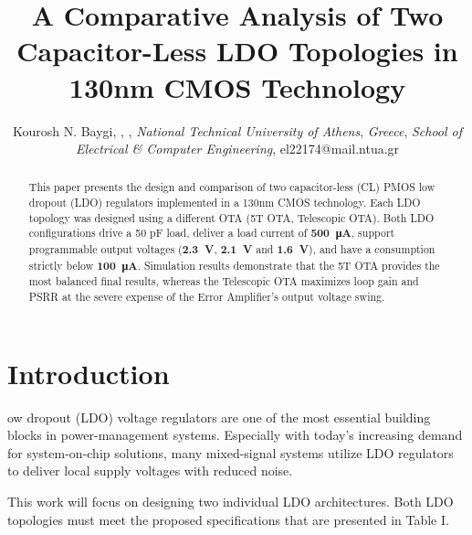 \documentclass[journal]{IEEEtran}
\begin{document}

\title{A Comparative Analysis of Two Capacitor-Less LDO Topologies in 130nm CMOS Technology}
\author{Kourosh N. Baygi, , , \textit{National Technical University of Athens}, \textit{Greece}, \textit{School of Electrical \& Computer Engineering}, el22174@mail.ntua.gr \vspace{-14pt}}
\maketitle

\begin{abstract}
This paper presents the design and comparison of two capacitor-less (CL) PMOS low dropout (LDO) regulators implemented in a 130nm CMOS technology. Each LDO topology was designed using a different OTA (5T OTA, Telescopic OTA). Both LDO configurations drive a 50 pF load, deliver a load current of {\bfseries \SI[per-mode=symbol,detect-weight]{500}{\micro\ampere}}, support programmable output voltages ({\bfseries \SI[per-mode=symbol,detect-weight]{2.3}{\volt}}, {\bfseries \SI[per-mode=symbol,detect-weight]{2.1}{\volt}} and {\bfseries \SI[per-mode=symbol,detect-weight]{1.6}{\volt}}), and have a consumption strictly below {\bfseries \SI[per-mode=symbol,detect-weight]{100}{\micro\ampere}}. Simulation results demonstrate that the 5T OTA provides the most balanced final results, whereas the Telescopic OTA maximizes loop gain and PSRR at the severe expense of the Error Amplifier's output voltage swing. 
\end{abstract}

\section{Introduction}
ow dropout (LDO) voltage regulators are one of the most essential building blocks in power-management systems. Especially with today's increasing demand for system-on-chip solutions, many mixed-signal systems utilize LDO regulators to deliver local supply voltages with reduced noise.

This work will focus on designing two individual LDO architectures. Both LDO topologies must meet the proposed specifications that are presented in Table I.
\end{document}

